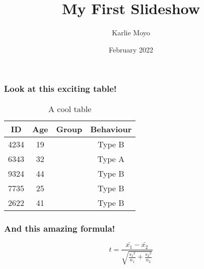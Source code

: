 \documentclass{beamer}
\title{\HUGE My First Slideshow}
\author{Karlie Moyo}
\date{February 2022}
\begin{document}
\frame{\titlepage}

\begin{frame}

\frametitle{Look at this exciting table!}

\begin{table}
	\begin{center}
		\begin{tabular}{ | c | c | c | c |}
			\hline
			ID & Age & Group & Behaviour\\
			\hline
			4234 & 19 & \alpha & Type B\\
			\hline
			6343 & 32 & \beta & Type A\\
			\hline
			9324 & 44 & \beta & Type B\\
			\hline
			7735 & 25 & \alpha & Type B\\
			\hline
			2622 & 41 & \beta & Type B\\
			\hline
		\end{tabular}
	\end{center}
	\caption{A cool table}
	\label{table2}
\end{table}

\end{frame}

\begin {frame}

\frametitle{And this amazing formula!}

\Huge

$$t=\frac{\bar{x_1} - \bar{x_2}}{\sqrt{\frac{{s_1}^2}{n_1} + \frac{{s_2}^2}{n_2}}}$$

\end {frame}
\end{document}

